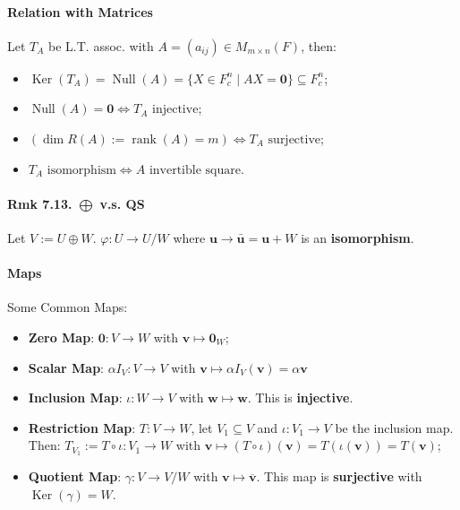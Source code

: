 \paragraph{Relation with Matrices} Let $T_A$ be L.T. assoc. with $A=(a_{ij})\in M_{m\times n}(F)$, then:
\begin{itemize}[noitemsep,nolistsep]
    \item $\operatorname{Ker}(T_A) =\operatorname{Null}(A) =\{X\in F_c^n\mid AX=\mathbf{0}\}\subseteq F_c^n$;
    \item $\operatorname{Null}(A)=\mathbf{0} \Leftrightarrow T_A\text{ injective}$;
    \item $(\dim R(A):=\operatorname{rank}(A)=m)\Leftrightarrow T_A \text{ surjective}$;
    \item $T_A \text{ isomorphism} \Leftrightarrow A \text{ invertible square}$.
\end{itemize}

\paragraph{Rmk 7.13. $\bigoplus$ v.s. QS} Let $V := U \oplus W$. $\varphi: U\rightarrow U/W$ where $\mathbf{u}\rightarrow\bar{\mathbf{u}}=\mathbf{u}+ W$ is an \textbf{isomorphism}.

\paragraph{Maps} Some Common Maps:
\begin{itemize}[noitemsep,nolistsep]
    \item \textbf{Zero Map}: $\mathbf{0}:V\rightarrow W$ with $\mathbf{v} \mapsto \mathbf{0}_W$;
    \item \textbf{Scalar Map}: $\alpha I_V:V\rightarrow V$ with $\mathbf{v}\mapsto \alpha I_V(\mathbf{v})= \alpha\mathbf{v}$
    \item \textbf{Inclusion Map}: $\iota : W\rightarrow V$ with $\mathbf{w}\mapsto \mathbf{w}$. This is \textbf{injective}.
    \item \textbf{Restriction Map}: $T:V\rightarrow W$, let $V_1\subseteq V$ and $\iota: V_1\rightarrow V$ be the inclusion map. Then: $T_{V_1}:=T\circ \iota: V_1 \rightarrow W$ with $\mathbf{v}\mapsto (T\circ \iota)(\mathbf{v}) = T(\iota(\mathbf{v})) = T(\mathbf{v})$;
    \item \textbf{Quotient Map}: $\gamma : V\rightarrow V/W$ with $\mathbf{v}\mapsto \overline{\mathbf{v}}$. This map is \textbf{surjective} with $\operatorname{Ker}(\gamma) = W$.
\end{itemize}

